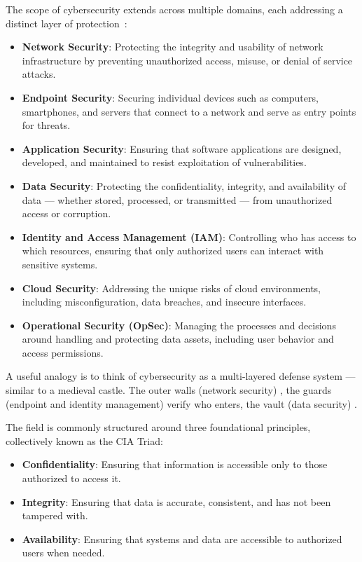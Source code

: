 The scope of cybersecurity extends across multiple domains, each addressing a distinct layer of protection~\cite{kang2023zero,cynet2023basics}:
\begin{itemize}
    \item \textbf{Network Security}: Protecting the integrity and usability of network infrastructure by preventing unauthorized access, misuse, or denial of service attacks.
    \item \textbf{Endpoint Security}: Securing individual devices such as computers, smartphones, and servers that connect to a network and serve as entry points for threats.
    \item \textbf{Application Security}: Ensuring that software applications are designed, developed, and maintained to resist exploitation of vulnerabilities.
    \item \textbf{Data Security}: Protecting the confidentiality, integrity, and availability of data --- whether stored, processed, or transmitted --- from unauthorized access or corruption.
    \item \textbf{Identity and Access Management (IAM)}: Controlling who has access to which resources, ensuring that only authorized users can interact with sensitive systems.
    \item \textbf{Cloud Security}: Addressing the unique risks of cloud environments, including misconfiguration, data breaches, and insecure interfaces.
    \item \textbf{Operational Security (OpSec)}: Managing the processes and decisions around handling and protecting data assets, including user behavior and access permissions.
\end{itemize}

A useful analogy is to think of cybersecurity as a multi-layered defense system --- similar to a medieval castle. The outer walls (network security) , the guards (endpoint and identity management) verify who enters, the vault (data security) .

The field is commonly structured around three foundational principles, collectively known as the CIA Triad:
\begin{itemize}
    \item \textbf{Confidentiality}: Ensuring that information is accessible only to those authorized to access it.
    \item \textbf{Integrity}: Ensuring that data is accurate, consistent, and has not been tampered with.
    \item \textbf{Availability}: Ensuring that systems and data are accessible to authorized users when needed.
\end{itemize}

